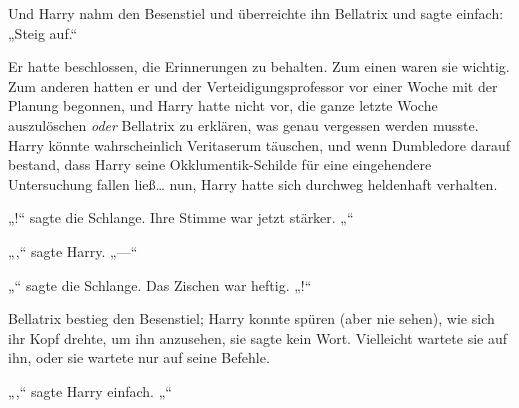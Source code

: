 Und Harry nahm den Besenstiel und überreichte ihn Bellatrix und sagte einfach: „Steig auf.“

Er hatte beschlossen, die Erinnerungen zu behalten. Zum einen waren sie wichtig. Zum anderen hatten er und der Verteidigungsprofessor vor einer Woche mit der Planung begonnen, und Harry hatte nicht vor, die ganze letzte Woche auszulöschen \emph{oder} Bellatrix zu erklären, was genau vergessen werden musste. Harry könnte wahrscheinlich Veritaserum täuschen, und wenn Dumbledore darauf bestand, dass Harry seine Okklumentik-Schilde für eine eingehendere Untersuchung fallen ließ… nun, Harry hatte sich durchweg heldenhaft verhalten.

„!“ sagte die Schlange. Ihre Stimme war jetzt stärker. „“

„,“ sagte Harry. „—“

„“ sagte die Schlange. Das Zischen war heftig. „!“

Bellatrix bestieg den Besenstiel; Harry konnte spüren (aber nie sehen), wie sich ihr Kopf drehte, um ihn anzusehen, sie sagte kein Wort. Vielleicht wartete sie auf ihn, oder sie wartete nur auf seine Befehle.

„,“ sagte Harry einfach. „“

